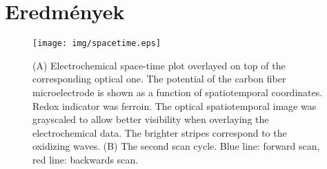 \chapter{Eredmények}
\pagestyle{headings}

\def\s{0.5}
\begin{figure}
\centering
\texttt{[image: img/spacetime.eps]}
\caption{(A) Electrochemical space-time plot overlayed on top of the corresponding optical one.
The potential of the carbon fiber microelectrode is shown as a function of spatiotemporal coordinates.
Redox indicator was ferroin.
The optical spatiotemporal image was grayscaled to allow better visibility when overlaying the electrochemical data.
The brighter stripes correspond to the oxidizing waves.
(B) The second scan cycle.
Blue line: forward scan, red line: backwards scan.
}
\label{fig:spatiotemporal}
\end{figure}
